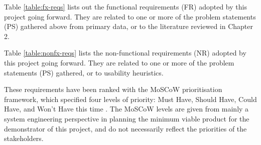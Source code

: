 Table \ref{table:fx-reqs} lists out the functional requirements (FR) adopted by this 
project going forward. They are related to one or more of the problem statements (PS) gathered 
above from primary data, or to the literature reviewed in Chapter 2. 

Table \ref{table:nonfx-reqs} lists the non-functional requirements (NR) adopted by this 
project going forward. They are related to one or more of the problem statements (PS) gathered, 
or to usability heuristics.

These requirements have been ranked with the MoSCoW prioritisation
framework, which specified four levels of priority: Must Have, Should Have, Could Have, and Won’t Have 
this time \citep{agile2018moscow}. The MoSCoW levels are given from mainly a system engineering perspective 
in planning the minimum viable product for the demonstrator of this project, 
and do not necessarily reflect the priorities of the stakeholders.

